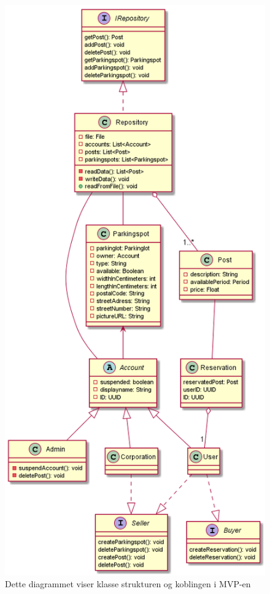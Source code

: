 \documentclass[12pt]{article}
\begin{document}
    \begin{figure}[H]
        \centering
        \includegraphics[scale=0.3]{bilder/prototypen/klassediagram_v2.png}
        \caption{Dette diagrammet viser klasse strukturen og koblingen i MVP-en}
    \end{figure}
\end{document}
